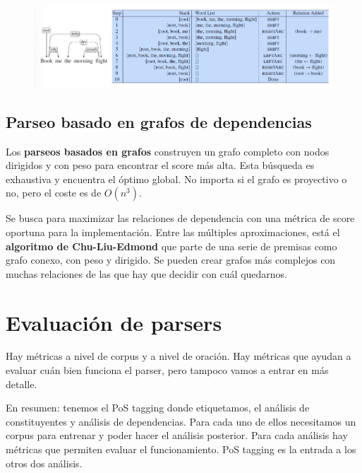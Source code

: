 \begin{figure}[h]
\centering
\includegraphics[width = \textwidth]{figs/transition-ej.png}
\end{figure}

\subsection{Parseo basado en grafos de dependencias}
Los \textbf{parseos basados en grafos} construyen un grafo completo con nodos dirigidos y con peso para encontrar el score más alta. Esta búsqueda es exhaustiva y encuentra el óptimo global. No importa si el grafo es proyectivo o no, pero el coste es de $O(n^3)$.

Se busca para maximizar las relaciones de dependencia con una métrica de score oportuna para la implementación. Entre las múltiples aproximaciones, está el \textbf{algoritmo de Chu-Liu-Edmond} que parte de una serie de premisas como grafo conexo, con peso y dirigido. Se pueden crear grafos más complejos con muchas relaciones de las que hay que decidir con cuál quedarnos.

\section{Evaluación de parsers}
Hay métricas a nivel de corpus y a nivel de oración. Hay métricas que ayudan a evaluar cuán bien funciona el parser, pero tampoco vamos a entrar en más detalle.

En resumen: tenemos el PoS tagging donde etiquetamos, el análisis de constituyentes y análisis de dependencias. Para cada uno de ellos necesitamos un corpus para entrenar y poder hacer el análisis posterior. Para cada análisis hay métricas que permiten evaluar el funcionamiento. PoS tagging es la entrada a los otros dos análisis. 